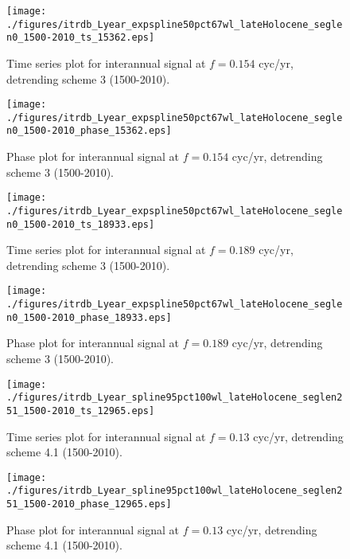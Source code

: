 \documentclass[phd,tocprelim]{cornell}
\begin{document}
\begin{figure}[!tbp]
\centering
\begin{minipage}[b]{0.45\textwidth}
\texttt{[image: ./figures/itrdb\_Lyear\_expspline50pct67wl\_lateHolocene\_seglen0\_1500-2010\_ts\_15362.eps]}
\caption{Time series plot for interannual signal at $f=0.154$ cyc/yr, detrending scheme 3 (1500-2010).}
\label{ts3p2}
\end{minipage}
\hfill
\begin{minipage}[b]{0.45\textwidth}
\texttt{[image: ./figures/itrdb\_Lyear\_expspline50pct67wl\_lateHolocene\_seglen0\_1500-2010\_phase\_15362.eps]}
\caption{Phase plot for interannual signal at $f=0.154$ cyc/yr, detrending scheme 3 (1500-2010).}
\label{map3p2}
\end{minipage}
\end{figure}

\begin{figure}[!tbp]
\centering
\begin{minipage}[b]{0.45\textwidth}
\texttt{[image: ./figures/itrdb\_Lyear\_expspline50pct67wl\_lateHolocene\_seglen0\_1500-2010\_ts\_18933.eps]}
\caption{Time series plot for interannual signal at $f=0.189$ cyc/yr, detrending scheme 3 (1500-2010).}
\label{ts3p3}
\end{minipage}
\hfill
\begin{minipage}[b]{0.45\textwidth}
\texttt{[image: ./figures/itrdb\_Lyear\_expspline50pct67wl\_lateHolocene\_seglen0\_1500-2010\_phase\_18933.eps]}
\caption{Phase plot for interannual signal at $f=0.189$ cyc/yr, detrending scheme 3 (1500-2010).}
\label{map3p3}
\end{minipage}
\end{figure}

\clearpage
\newpage

\begin{figure}[!tbp]
\centering
\begin{minipage}[b]{0.45\textwidth}
\texttt{[image: ./figures/itrdb\_Lyear\_spline95pct100wl\_lateHolocene\_seglen251\_1500-2010\_ts\_12965.eps]}
\caption{Time series plot for interannual signal at $f=0.13$ cyc/yr, detrending scheme 4.1 (1500-2010).}
\label{ts4.1p1}
\end{minipage}
\hfill
\begin{minipage}[b]{0.45\textwidth}
\texttt{[image: ./figures/itrdb\_Lyear\_spline95pct100wl\_lateHolocene\_seglen251\_1500-2010\_phase\_12965.eps]}
\caption{Phase plot for interannual signal at $f=0.13$ cyc/yr, detrending scheme 4.1 (1500-2010).}
\label{map4.1p1}
\end{minipage}
\end{figure}
\end{document}
